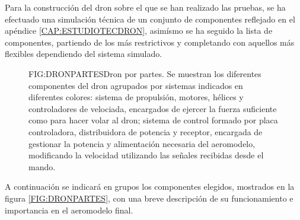 
Para la construcción del dron sobre el que se han realizado las pruebas, se ha efectuado una simulación técnica de un conjunto de componentes reflejado en el apéndice \ref{CAP:ESTUDIOTECDRON}, asimísmo se ha seguido la lista de componentes, partiendo de los más restrictivos y completando con aquellos más flexibles dependiendo del sistema simulado.
 
\begin{figure}[Dron básico]{FIG:DRONPARTES}{Dron por partes. Se muestran los diferentes componentes del dron agrupados por sistemas indicados en diferentes colores: sistema de propulsión, motores, hélices y controladores de velociada, encargados de ejercer la fuerza suficiente como para hacer volar al dron; sistema de control formado por placa controladora, distribuidora de potencia y receptor, encargada de gestionar la potencia y alimentación necesaria del aeromodelo, modificando la velocidad utilizando las señales recibidas desde el mando.}
\end{figure}

A continuación se indicará en grupos los componentes elegidos, mostrados en la figura \ref{FIG:DRONPARTES}, con una breve descripción de su funcionamiento e importancia en el aeromodelo final.